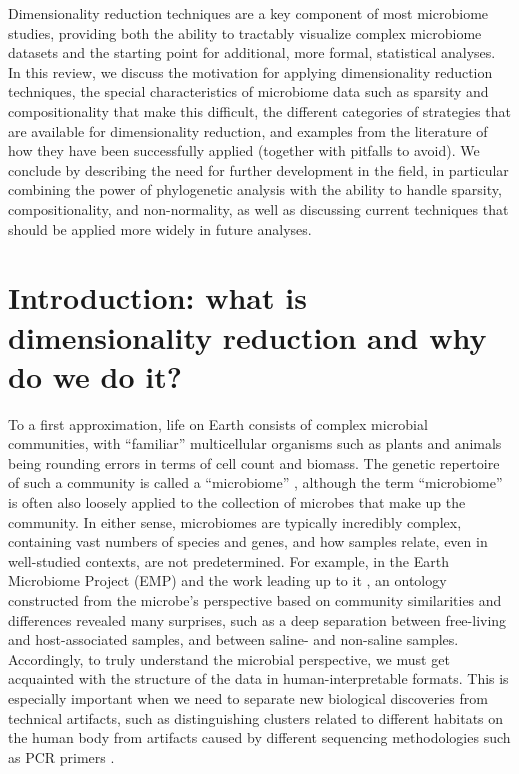 \glsresetall


Dimensionality reduction techniques are a key component of most microbiome studies, providing both the ability to tractably visualize complex microbiome datasets and the starting point for additional, more formal, statistical analyses. In this review, we discuss the motivation for applying dimensionality reduction techniques, the special characteristics of microbiome data such as sparsity and compositionality that make this difficult, the different categories of strategies that are available for dimensionality reduction, and examples from the literature of how they have been successfully applied (together with pitfalls to avoid). We conclude by describing the need for further development in the field, in particular combining the power of phylogenetic analysis with the ability to handle sparsity, compositionality, and non-normality, as well as discussing current techniques that should be applied more widely in future analyses.

\section{Introduction: what is dimensionality reduction and why do we do it?} 

To a first approximation, life on Earth consists of complex microbial communities, with “familiar” multicellular organisms such as plants and animals being rounding errors in terms of cell count and biomass. The genetic repertoire of such a community is called a “microbiome” \cite{Turnbaugh2007-nr}, although the term “microbiome” is often also loosely applied to the collection of microbes that make up the community. In either sense, microbiomes are typically incredibly complex, containing vast numbers of species and genes, and how samples relate, even in well-studied contexts, are not predetermined. For example, in the Earth Microbiome Project (EMP) \cite{Thompson2017-pu} and the work leading up to it \cite{Lozupone2007-yr,Caporaso2011-xp,Ley2008-cu}, an ontology constructed from the microbe’s perspective based on community similarities and differences revealed many surprises, such as a deep separation between free-living and host-associated samples, and between saline- and non-saline samples. Accordingly, to truly understand the microbial perspective, we must get acquainted with the structure of the data in human-interpretable formats. This is especially important when we need to separate new biological discoveries from technical artifacts, such as distinguishing clusters related to different habitats on the human body from artifacts caused by different sequencing methodologies such as PCR primers \cite{The_Human_Microbiome_Project_Consortium2012-og}.

